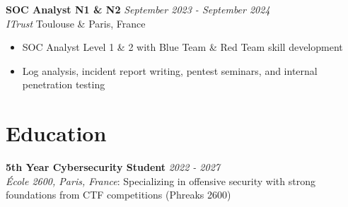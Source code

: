 \documentclass[9pt,a4paper]{extarticle}
\newcommand{\experienceitem}[4]{
\textbf{#1} \hfill \textit{#2} \\
\textit{#3} \hfill #4
}
\begin{document}
\experienceitem{SOC Analyst N1 \& N2}{September 2023 - September 2024}{ITrust}{Toulouse \& Paris, France}
\begin{itemize}
\item SOC Analyst Level 1 \& 2 with Blue Team \& Red Team skill development
\item Log analysis, incident report writing, pentest seminars, and internal penetration testing
\end{itemize}

\section{Education}

\textbf{5th Year Cybersecurity Student} \hfill \textit{2022 - 2027} \\
\textit{École 2600, Paris, France}: Specializing in offensive security with strong foundations from CTF competitions (Phreaks 2600)
\end{document}
